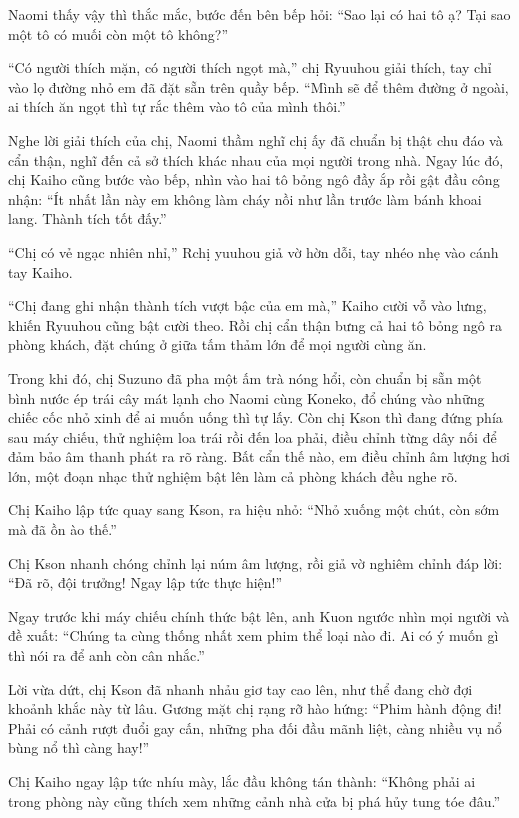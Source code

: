 \documentclass[../main.tex]{subfiles}
\begin{document}
Naomi thấy vậy thì thắc mắc, bước đến bên bếp hỏi: ``Sao lại có hai tô ạ? Tại sao một tô có muối còn một tô không?''

``Có người thích mặn, có người thích ngọt mà,'' chị Ryuuhou giải thích, tay chỉ vào lọ đường nhỏ em đã đặt sẵn trên quầy bếp. ``Mình sẽ để thêm đường ở ngoài, ai thích ăn ngọt thì tự rắc thêm vào tô của mình thôi.''

Nghe lời giải thích của chị, Naomi thầm nghĩ chị ấy đã chuẩn bị thật chu đáo và cẩn thận, nghĩ đến cả sở thích khác nhau của mọi người trong nhà. Ngay lúc đó, chị Kaiho cũng bước vào bếp, nhìn vào hai tô bỏng ngô đầy ắp rồi gật đầu công nhận: ``Ít nhất lần này em không làm cháy nồi như lần trước làm bánh khoai lang. Thành tích tốt đấy.''

``Chị có vẻ ngạc nhiên nhỉ,'' Rchị yuuhou giả vờ hờn dỗi, tay nhéo nhẹ vào cánh tay Kaiho.

``Chị đang ghi nhận thành tích vượt bậc của em mà,'' Kaiho cười vỗ vào lưng, khiến Ryuuhou cũng bật cười theo. Rồi chị cẩn thận bưng cả hai tô bỏng ngô ra phòng khách, đặt chúng ở giữa tấm thảm lớn để mọi người cùng ăn.

Trong khi đó, chị Suzuno đã pha một ấm trà nóng hổi, còn chuẩn bị sẵn một bình nước ép trái cây mát lạnh cho Naomi cùng Koneko, đổ chúng vào những chiếc cốc nhỏ xinh để ai muốn uống thì tự lấy. Còn chị Kson thì đang đứng phía sau máy chiếu, thử nghiệm loa trái rồi đến loa phải, điều chỉnh từng dây nối để đảm bảo âm thanh phát ra rõ ràng. Bất cẩn thế nào, em điều chỉnh âm lượng hơi lớn, một đoạn nhạc thử nghiệm bật lên làm cả phòng khách đều nghe rõ.

Chị Kaiho lập tức quay sang Kson, ra hiệu nhỏ: ``Nhỏ xuống một chút, còn sớm mà đã ồn ào thế.''

Chị Kson nhanh chóng chỉnh lại núm âm lượng, rồi giả vờ nghiêm chỉnh đáp lời: ``Đã rõ, đội trưởng! Ngay lập tức thực hiện!''

\ct

Ngay trước khi máy chiếu chính thức bật lên, anh Kuon ngước nhìn mọi người và đề xuất: ``Chúng ta cùng thống nhất xem phim thể loại nào đi. Ai có ý muốn gì thì nói ra để anh còn cân nhắc.''

Lời vừa dứt, chị Kson đã nhanh nhảu giơ tay cao lên, như thể đang chờ đợi khoảnh khắc này từ lâu. Gương mặt chị rạng rỡ hào hứng: ``Phim hành động đi! Phải có cảnh rượt đuổi gay cấn, những pha đối đầu mãnh liệt, càng nhiều vụ nổ bùng nổ thì càng hay!''

Chị Kaiho ngay lập tức nhíu mày, lắc đầu không tán thành: ``Không phải ai trong phòng này cũng thích xem những cảnh nhà cửa bị phá hủy tung tóe đâu.''
\end{document}
